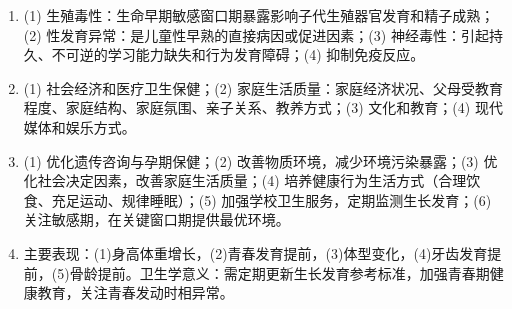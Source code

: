 {\begin{enumerate}[leftmargin=*, itemsep=5pt]
    \item (1) 生殖毒性：生命早期敏感窗口期暴露影响子代生殖器官发育和精子成熟；(2) 性发育异常：是儿童性早熟的直接病因或促进因素；(3) 神经毒性：引起持久、不可逆的学习能力缺失和行为发育障碍；(4) 抑制免疫反应。

    \item (1) 社会经济和医疗卫生保健；(2) 家庭生活质量：家庭经济状况、父母受教育程度、家庭结构、家庭氛围、亲子关系、教养方式；(3) 文化和教育；(4) 现代媒体和娱乐方式。

    \item (1) 优化遗传咨询与孕期保健；(2) 改善物质环境，减少环境污染暴露；(3) 优化社会决定因素，改善家庭生活质量；(4) 培养健康行为生活方式（合理饮食、充足运动、规律睡眠）；(5) 加强学校卫生服务，定期监测生长发育；(6) 关注敏感期，在关键窗口期提供最优环境。

    \item 主要表现：(1)身高体重增长，(2)青春发育提前，(3)体型变化，(4)牙齿发育提前，(5)骨龄提前。卫生学意义：需定期更新生长发育参考标准，加强青春期健康教育，关注青春发动时相异常。
\end{enumerate}
}

\newpage
